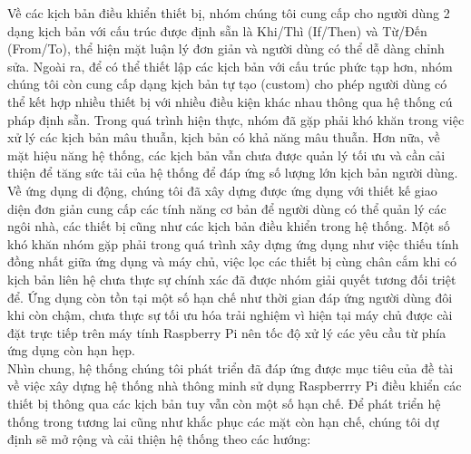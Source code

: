\documentclass[12pt,a4paper,oneside]{extbook}
\begin{document}
\noindent
Về các kịch bản điều khiển thiết bị, nhóm chúng tôi cung cấp cho người dùng 2 dạng kịch bản với cấu trúc được định sẵn là Khi/Thì (If/Then) và Từ/Đến (From/To), thể hiện mặt luận lý đơn giản và người dùng có thể dễ dàng chỉnh sửa. Ngoài ra, để có thể thiết lập các kịch bản với cấu trúc phức tạp hơn, nhóm chúng tôi còn cung cấp dạng kịch bản tự tạo (custom) cho phép người dùng có thể kết hợp nhiều thiết bị với nhiều điều kiện khác nhau thông qua hệ thống cú pháp định sẵn. Trong quá trình hiện thực, nhóm đã gặp phải khó khăn trong việc xử lý các kịch bản mâu thuẫn, kịch bản có khả năng mâu thuẫn. Hơn nữa, về mặt hiệu năng hệ thống, các kịch bản vẫn chưa được quản lý tối ưu và cần cải thiện để tăng sức tải của hệ thống để đáp ứng số lượng lớn kịch bản người dùng.\\

\noindent
Về ứng dụng di động, chúng tôi đã xây dựng được ứng dụng với thiết kế giao diện đơn giản cung cấp các tính năng cơ bản để người dùng có thể quản lý các ngôi nhà, các thiết bị cũng như các kịch bản điều khiển trong hệ thống. Một số khó khăn nhóm gặp phải trong quá trình xây dựng ứng dụng như việc thiếu tính đồng nhất giữa ứng dụng và máy chủ, việc lọc các thiết bị cùng chân cắm khi có kịch bản liên hệ chưa thực sự chính xác đã được nhóm giải quyết tương đối triệt để. Ứng dụng còn tồn tại một số hạn chế như thời gian đáp ứng người dùng đôi khi còn chậm, chưa thực sự tối ưu hóa trải nghiệm vì hiện tại máy chủ được cài đặt trực tiếp trên máy tính Raspberry Pi nên tốc độ xử lý các yêu cầu từ phía ứng dụng còn hạn hẹp.\\

\noindent
Nhìn chung, hệ thống chúng tôi phát triển đã đáp ứng được mục tiêu của đề tài về việc xây dựng hệ thống nhà thông minh sử dụng Raspberrry Pi điều khiển các thiết bị thông qua các kịch bản tuy vẫn còn một số hạn chế. Để phát triển hệ thống trong tương lai cũng như khắc phục các mặt còn hạn chế, chúng tôi dự định sẽ mở rộng và cải thiện hệ thống theo các hướng:
\end{document}
